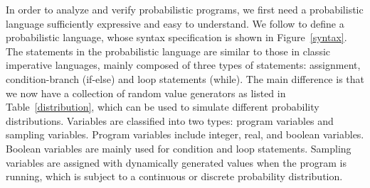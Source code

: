 \documentclass[sigconf,review, anonymous]{acmart}
\begin{document}
In order to analyze and verify probabilistic programs, we first need a probabilistic language sufficiently expressive and easy to understand. We follow \cite{Minka2012Compiler} to define a probabilistic language, whose syntax specification is shown in Figure~\ref{syntax}. The statements in the probabilistic language are similar to those in classic imperative languages, mainly composed of three types of statements: assignment, condition-branch (if-else) and loop statements (while). The main difference is that we now have a collection of random value generators as listed in Table~\ref{distribution}, which can be used to simulate different probability distributions. Variables are classified into two types: program variables and sampling variables. Program variables include integer, real, and boolean variables. Boolean variables are mainly used for condition  and loop statements. Sampling variables are assigned with dynamically generated values when the program is running, which is subject to a continuous  or discrete probability distribution.
\end{document}
